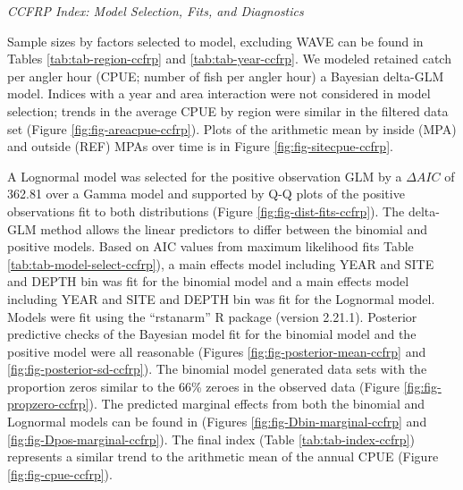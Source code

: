 \documentclass[
]{article}
\begin{document}
\emph{CCFRP Index: Model Selection, Fits, and Diagnostics}

Sample sizes by factors selected to model, excluding WAVE can be found in Tables
\ref{tab:tab-region-ccfrp} and \ref{tab:tab-year-ccfrp}.
We modeled retained catch per angler hour (CPUE; number of fish per angler hour)
a Bayesian delta-GLM model. Indices with a year and area interaction were not
considered in model selection; trends in the average CPUE by region were similar
in the filtered data set (Figure \ref{fig:fig-areacpue-ccfrp}). Plots of the arithmetic
mean by inside (MPA) and outside (REF) MPAs over time is in Figure \ref{fig:fig-sitecpue-ccfrp}.

A Lognormal model was
selected for the positive observation GLM by
a \(\Delta AIC\) of 362.81 over a Gamma model and supported by Q-Q plots of the positive observations fit to both distributions (Figure \ref{fig:fig-dist-fits-ccfrp}). The delta-GLM
method allows the linear predictors to differ between the binomial and positive models.
Based on AIC values from maximum likelihood fits Table \ref{tab:tab-model-select-ccfrp}),
a main effects model including
YEAR and SITE and DEPTH bin
was fit for the binomial model and a main
effects model including
YEAR and SITE and DEPTH bin
was fit for the Lognormal model.
Models were fit using the ``rstanarm'' R package (version 2.21.1). Posterior predictive
checks of the Bayesian model fit for the binomial model and the positive model
were all reasonable (Figures \ref{fig:fig-posterior-mean-ccfrp} and
\ref{fig:fig-posterior-sd-ccfrp}). The binomial model generated data sets with the
proportion zeros similar to the 66\% zeroes in the observed data
(Figure \ref{fig:fig-propzero-ccfrp}). The predicted marginal effects from
both the binomial and Lognormal models can be found in (Figures \ref{fig:fig-Dbin-marginal-ccfrp} and \ref{fig:fig-Dpos-marginal-ccfrp}). The
final index (Table \ref{tab:tab-index-ccfrp})
represents a similar trend to the arithmetic mean of the annual CPUE (Figure \ref{fig:fig-cpue-ccfrp}).

\newpage
\end{document}

